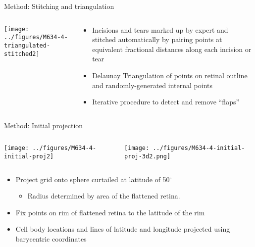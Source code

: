 \documentclass[final,hyperref={pdfpagelabels=false}]{beamer}
\begin{document}
\begin{frame}{}
\begin{columns}[T]
\begin{column}{.33\linewidth}
      \begin{block}{Method: Stitching and triangulation}
        \begin{columns}
          \begin{column}{0.38\linewidth}
            \texttt{[image: ../figures/M634-4-triangulated-stitched2]}            
          \end{column}
          \begin{column}{0.5\linewidth}
            \begin{itemize}
            \item Incisions and tears marked up by expert and stitched
              automatically by pairing points at equivalent fractional
              distances along each incision or tear
            \item Delaunay Triangulation of points on retinal outline and
              randomly-generated internal points
            \item Iterative procedure to detect and remove ``flaps''
            \end{itemize}
          \end{column}
        \end{columns}
      \end{block}


      \begin{block}{Method: Initial projection}
        \begin{columns}
          \begin{column}{0.38\linewidth}
            \texttt{[image: ../figures/M634-4-initial-proj2]}
          \end{column}
          \begin{column}{0.5\linewidth}
            \texttt{[image: ../figures/M634-4-initial-proj-3d2.png]}  

          \end{column}
        \end{columns}
            \begin{itemize}
            \item Project grid onto sphere curtailed at latitude of 50$^\circ$
              \begin{itemize}
              \item Radius determined by area of the flattened retina.
              \end{itemize}
            \item Fix points on rim of flattened retina to the
              latitude of the rim 
            \item Cell body locations and lines of latitude and
              longitude projected using barycentric coordinates
            \end{itemize}


\end{block}
\end{column}
\end{columns}
\end{frame}
\end{document}
